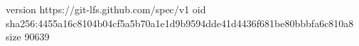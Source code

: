 version https://git-lfs.github.com/spec/v1
oid sha256:4455a16c8104b04cf5a5b70a1e1d9b9594dde41d4436f681be80bbbfa6c810a8
size 90639
